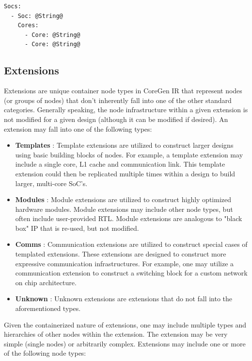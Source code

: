 \documentclass{article}
\begin{document}
\vspace{0.125in}
\begin{lstlisting}[frame=single,style=base,caption={SoC Node Definition},captionpos=b,label={lis:soc}]
Socs:
  - Soc: @String@
    Cores:
      - Core: @String@
      - Core: @String@
\end{lstlisting}


\clearpage
\subsection{Extensions}
\label{sec:ExtensionNodes}

Extensions are unique container node types in CoreGen IR that represent nodes (or groups of nodes) that don't inherently 
fall into one of the other standard categories.  Generally speaking, the node infrastructure within a given extension 
is not modified for a given design (although it can be modified if desired).  An extension may fall into one of the following types: 

\begin{itemize}
\item \textbf{Templates} : Template extensions are utilized to construct larger designs using basic building blocks of 
nodes.  For example, a template extension may include a single core, L1 cache and communication link.  This template 
extension could then be replicated multiple times within a design to build larger, multi-core SoC's.
 
\item \textbf{Modules} : Module extensions are utilized to construct highly optimized hardware modules.  Module extensions 
may include other node types, but often include user-provided RTL.  Module extensions are analogous to "black box" IP 
that is re-used, but not modified.    

\item \textbf{Comms} : Communication extensions are utilized to construct special cases of templated extensions.  These 
extensions are designed to construct more expressive communication infrastructures.  For example, one may utilize a 
communication extension to construct a switching block for a custom network on chip architecture.  

\item \textbf{Unknown} : Unknown extensions are extensions that do not fall into the aforementioned types.  
\end{itemize}

Given the containerized nature of extensions, one may include multiple types and hierarchies of other nodes 
within the extension.  The extension may be very simple (single nodes) or arbitrarily complex.  Extensions may 
include one or more of the following node types: 
\end{document}
